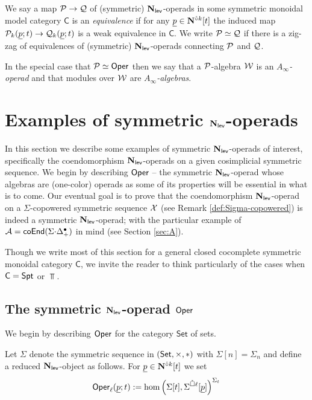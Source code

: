 \begin{definition} \label{def:equiv-of-Nl-ops} We say a map $\mathcal{P}\to\mathcal{Q}$ of (symmetric) $\mathbf{N}_{\mathsf{lev}}$-operads in some symmetric monoidal model category $\mathsf{C}$ is an \textit{equivalence} if for any $\underline{p}\in\mathbf{N}^{\hat{\circ}k}[t]$ the induced map $\mathcal{P}_k(\underline{p};t)\to\mathcal{Q}_k(\underline{p};t)$ is a weak equivalence in $\mathsf{C}$. We write $\mathcal{P}\simeq \mathcal{Q}$ if there is a zig-zag of equivalences of (symmetric) $\mathbf{N}_{\mathsf{lev}}$-operads connecting $\mathcal{P}$ and $\mathcal{Q}$. 

In the special case that $\mathcal{P}\simeq \mathsf{Oper}$ then we say that a $\mathcal{P}$-algebra $\mathcal{W}$ is an \textit{$A_{\infty}$-operad} and that modules over $\mathcal{W}$ are \textit{$A_{\infty}$-algebras}.
\end{definition}

\section{Examples of symmetric $\mathbf{N}_{\mathsf{lev}}$-operads}
In this section we describe some examples of symmetric $\mathbf{N}_{\mathsf{lev}}$-operads of interest, specifically the coendomorphism $\mathbf{N}_{\mathsf{lev}}$-operads on a given cosimplicial symmetric sequence. We begin by describing $\mathsf{Oper}$ -- the symmetric $\mathbf{N}_{\mathsf{lev}}$-operad whose algebras are (one-color) operads as some of its properties will be essential in what is to come. Our eventual goal is to prove that the coendomorphism $\mathbf{N}_{\mathsf{lev}}$-operad on a $\Sigma$-copowered symmetric sequence $\mathcal{X}$ (see Remark \ref{def:Sigma-copowered}) is indeed a symmetric $\mathbf{N}_{\mathsf{lev}}$-operad; with the particular example of $\mathcal{A}= \mathsf{coEnd}(\Sigma{\cdot}\Delta^{\bullet}_+)$ in mind (see Section \ref{sec:A}). 

Though we write most of this section for a general closed cocomplete symmetric monoidal category $\mathsf{C}$, we invite the reader to think particularly of the cases when $\mathsf{C}=\mathsf{Spt}$ or $\Top$.

\subsection{The symmetric $\mathbf{N}_{\mathsf{lev}}$-operad $\mathsf{Oper}$} \label{sec:oper-def}
We begin by describing $\mathsf{Oper}$ for the category $\mathsf{Set}$ of sets.

\begin{definition} \label{def-of-Oper} %
    Let $\Sigma$ denote the symmetric sequence in $(\mathsf{Set}, \times, *)$ with $\Sigma[n]=\Sigma_n$ and define a reduced $\mathbf{N}_{\mathsf{lev}}$-object as follows. For $\underline{p}\in \mathbf{N}^{\hat{\circ}k}[t]$ we set \[ \mathsf{Oper}_{\ell}( \underline{p};t) := \hom\left( \Sigma[t] , \Sigma^{\mathring{\square} \ell}[\underline{p}] \right)^{\Sigma_t}\]
\end{definition}

